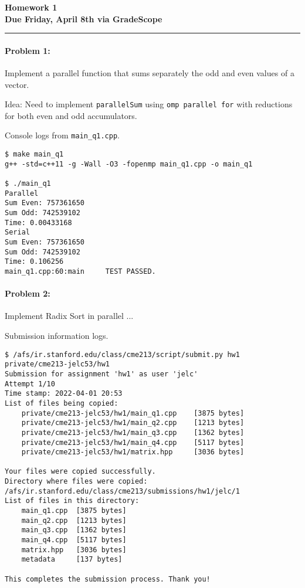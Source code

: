 \documentclass[12pt,letterpaper,twoside]{article}
\begin{document}
{\centering \textbf{Homework 1\\ Due Friday, April 8th via GradeScope\\}}
\vspace*{-8pt}\noindent\rule{\linewidth}{1pt}

\paragraph{Problem 1: } Implement a parallel function that sums separately the odd
and even values of a vector. 

Idea: Need to implement \texttt{parallelSum} using \texttt{omp parallel for} with 
reductions for both even and odd accumulators.


Console logs from \texttt{main\_q1.cpp}.
\begin{verbatim}
$ make main_q1
g++ -std=c++11 -g -Wall -O3 -fopenmp main_q1.cpp -o main_q1

$ ./main_q1
Parallel
Sum Even: 757361650
Sum Odd: 742539102
Time: 0.00433168
Serial
Sum Even: 757361650
Sum Odd: 742539102
Time: 0.106256
main_q1.cpp:60:main     TEST PASSED.
\end{verbatim}


\paragraph{Problem 2: } Implement Radix Sort in parallel ...

Submission information logs.
\begin{verbatim}
$ /afs/ir.stanford.edu/class/cme213/script/submit.py hw1 private/cme213-jelc53/hw1
Submission for assignment 'hw1' as user 'jelc'
Attempt 1/10
Time stamp: 2022-04-01 20:53
List of files being copied:
    private/cme213-jelc53/hw1/main_q1.cpp	 [3875 bytes]
    private/cme213-jelc53/hw1/main_q2.cpp	 [1213 bytes]
    private/cme213-jelc53/hw1/main_q3.cpp	 [1362 bytes]
    private/cme213-jelc53/hw1/main_q4.cpp	 [5117 bytes]
    private/cme213-jelc53/hw1/matrix.hpp	 [3036 bytes]

Your files were copied successfully.
Directory where files were copied: /afs/ir.stanford.edu/class/cme213/submissions/hw1/jelc/1
List of files in this directory:
    main_q1.cpp	 [3875 bytes]
    main_q2.cpp	 [1213 bytes]
    main_q3.cpp	 [1362 bytes]
    main_q4.cpp	 [5117 bytes]
    matrix.hpp	 [3036 bytes]
    metadata	 [137 bytes]

This completes the submission process. Thank you!
\end{verbatim}
\end{document}
